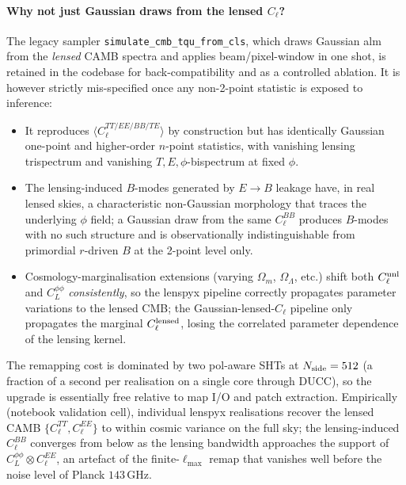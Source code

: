 \documentclass[11pt]{article}
\theoremstyle{definition}
\begin{document}
\paragraph{Why not just Gaussian draws from the lensed $C_\ell$?}
The legacy sampler \texttt{simulate\_cmb\_tqu\_from\_cls}, which draws Gaussian alm from the \emph{lensed} CAMB spectra and applies beam/pixel-window in one shot, is retained in the codebase for back-compatibility and as a controlled ablation. It is however strictly mis-specified once any non-2-point statistic is exposed to inference:
\begin{itemize}[leftmargin=1.5em,itemsep=0.1em]
  \item It reproduces $\langle C_\ell^{TT/EE/BB/TE}\rangle$ by construction but has identically Gaussian one-point and higher-order $n$-point statistics, with vanishing lensing trispectrum and vanishing $T,E,\phi$-bispectrum at fixed $\phi$.
  \item The lensing-induced $B$-modes generated by $E\!\to\!B$ leakage have, in real lensed skies, a characteristic non-Gaussian morphology that traces the underlying $\phi$ field; a Gaussian draw from the same $C_\ell^{BB}$ produces $B$-modes with no such structure and is observationally indistinguishable from primordial $r$-driven $B$ at the 2-point level only.
  \item Cosmology-marginalisation extensions (varying $\Omega_m$, $\Omega_\Lambda$, etc.) shift both $C_\ell^{\rm unl}$ and $C_L^{\phi\phi}$ \emph{consistently}, so the lenspyx pipeline correctly propagates parameter variations to the lensed CMB; the Gaussian-lensed-$C_\ell$ pipeline only propagates the marginal $C_\ell^{\rm lensed}$, losing the correlated parameter dependence of the lensing kernel.
\end{itemize}
The remapping cost is dominated by two pol-aware SHTs at $N_{\rm side}=512$ (a fraction of a second per realisation on a single core through DUCC), so the upgrade is essentially free relative to map I/O and patch extraction. Empirically (notebook validation cell), individual lenspyx realisations recover the lensed CAMB $\{C_\ell^{TT},C_\ell^{EE}\}$ to within cosmic variance on the full sky; the lensing-induced $C_\ell^{BB}$ converges from below as the lensing bandwidth approaches the support of $C_L^{\phi\phi}\!\otimes\!C_\ell^{EE}$, an artefact of the finite-$\ell_{\max}$ remap that vanishes well before the noise level of Planck $143\,\mathrm{GHz}$.
\end{document}
